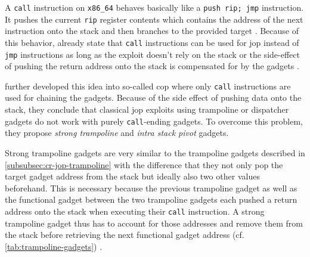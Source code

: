 A \texttt{call} instruction on \texttt{x86\_64} behaves basically like a \texttt{push rip; jmp} instruction.
It pushes the current \texttt{rip} register contents which contains the address of the next instruction onto the stack and then branches to the provided target \cite[3-122\psqq]{IntelCorporation2020}.
Because of this behavior, \citeauthor{Bletsch2011} already state that \texttt{call} instructions can be used for \gls{jop} instead of \texttt{jmp} instructions as long as the exploit doesn't rely on the stack or the side-effect of pushing the return address onto the stack is compensated for by the gadgets \cite{Bletsch2011}.

\citeauthor{Sadeghi2018} further developed this idea into so-called \gls{cop} where only \texttt{call} instructions are used for chaining the gadgets.
Because of the side effect of pushing data onto the stack, they conclude that classical \gls{jop} exploits using trampoline or dispatcher gadgets do not work with purely \texttt{call}-ending gadgets.
To overcome this problem, they propose \emph{strong trampoline} and \emph{intra stack pivot} gadgets.

Strong trampoline gadgets are very similar to the trampoline gadgets described in \cref{subsubsec:cr-jop-trampoline} with the difference that they not only pop the target gadget address from the stack but ideally also two other values beforehand.
This is necessary because the previous trampoline gadget as well as the functional gadget between the two trampoline gadgets each pushed a return address onto the stack when executing their \texttt{call} instruction.
A strong trampoline gadget thus has to account for those addresses and remove them from the stack before retrieving the next functional gadget address (cf. \cref{tab:trampoline-gadgets}) \cite{Sadeghi2018}.

 \begin{table}[ht]
	\centering
	\caption{Comparison between exemplary trampoline gadget as in \cite{Checkoway2010} and strong trampoline gadget as in \cite{Sadeghi2018}}
	\label{tab:trampoline-gadgets}
\end{table}

